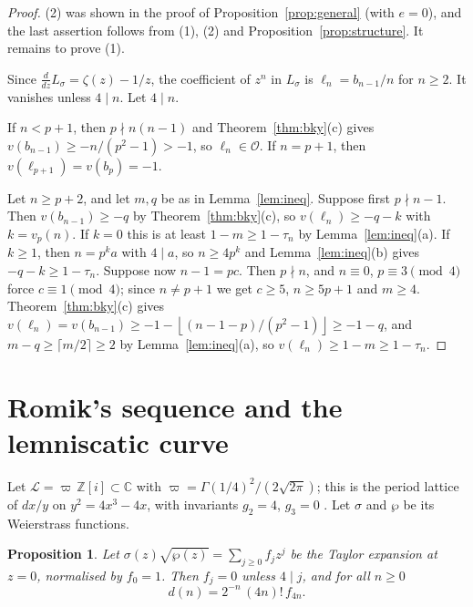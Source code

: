 \documentclass[11pt]{amsart}
\newtheorem{proposition}[theorem]{Proposition}
\theoremstyle{definition}
\theoremstyle{remark}
\newcommand{\Z}{\mathbb{Z}}
\newcommand{\C}{\mathbb{C}}
\newcommand{\cO}{\mathcal{O}}
\newcommand{\fl}[1]{\left\lfloor #1 \right\rfloor}
\begin{document}
\begin{proof}
(2) was shown in the proof of Proposition~\ref{prop:general} (with $e=0$), and the last assertion
follows from (1), (2) and Proposition~\ref{prop:structure}. It remains to prove (1).

Since $\frac{d}{dz}L_\sigma=\zeta(z)-1/z$, the coefficient of $z^n$
in $L_\sigma$ is $\ell_n=b_{n-1}/n$ for $n\ge2$. It vanishes unless $4\mid n$. Let $4\mid n$.

If $n<p+1$, then $p\nmid n(n-1)$ and Theorem~\ref{thm:bky}(c) gives $v(b_{n-1})\ge-n/(p^2-1)>-1$,
so $\ell_n\in\cO$. If $n=p+1$, then $v(\ell_{p+1})=v(b_p)=-1$.

Let $n\ge p+2$, and let $m,q$ be as in Lemma~\ref{lem:ineq}. Suppose first $p\nmid n-1$. Then
$v(b_{n-1})\ge-q$ by Theorem~\ref{thm:bky}(c), so $v(\ell_n)\ge-q-k$ with $k=v_p(n)$. If $k=0$ this
is at least $1-m\ge1-\tau_n$ by Lemma~\ref{lem:ineq}(a). If $k\ge1$, then $n=p^ka$ with $4\mid a$,
so $n\ge4p^k$ and Lemma~\ref{lem:ineq}(b) gives $-q-k\ge1-\tau_n$. Suppose now $n-1=pc$. Then
$p\nmid n$, and $n\equiv0$, $p\equiv3\pmod4$ force $c\equiv1\pmod4$; since $n\ne p+1$ we get
$c\ge5$, $n\ge5p+1$ and $m\ge4$. Theorem~\ref{thm:bky}(c) gives
$v(\ell_n)=v(b_{n-1})\ge-1-\fl{(n-1-p)/(p^2-1)}\ge-1-q$, and $m-q\ge\lceil m/2\rceil\ge2$ by
Lemma~\ref{lem:ineq}(a), so $v(\ell_n)\ge1-m\ge1-\tau_n$.
\end{proof}

\section{Romik's sequence and the lemniscatic curve}\label{sec:romik}

Let $\mathcal L=\varpi\,\Z[i]\subset\C$ with $\varpi=\Gamma(1/4)^2/(2\sqrt{2\pi})$; this is the period
lattice of $dx/y$ on $y^2=4x^3-4x$, with invariants $g_2=4$, $g_3=0$
\cite[(23.5.4)]{DLMF}. Let $\sigma$ and $\wp$ be its Weierstrass functions.

\begin{proposition}\label{prop:identify}
Let $\sigma(z)\sqrt{\wp(z)}=\sum_{j\ge0}f_jz^j$ be the Taylor expansion at $z=0$, normalised by
$f_0=1$. Then $f_j=0$ unless $4\mid j$, and for all $n\ge0$
\[
d(n)=2^{-n}\,(4n)!\,f_{4n}.
\]
\end{proposition}
\end{document}
